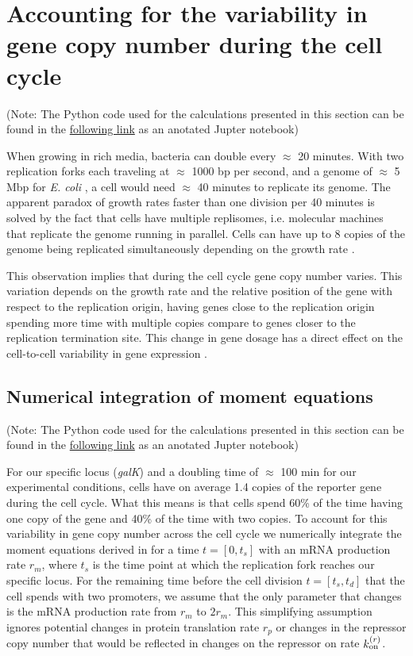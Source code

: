 \section{Accounting for the variability in gene copy number during the cell
cycle} \label{supp_multi_gene}

(Note: The Python code used for the calculations presented in this section can
be found in the
\href{https://www.rpgroup.caltech.edu/chann_cap/src/theory/html/moment_dynamics_cell_division.html}{following
link} as an anotated Jupter notebook)

When growing in rich media, bacteria can double every $\approx$ 20 minutes.
With two replication forks each traveling at $\approx$ 1000 bp per second, and
a genome of $\approx$ 5 Mbp for {\it E. coli} \cite{Moran2010}, a cell would
need $\approx$ 40 minutes to replicate its genome. The apparent paradox  of
growth rates faster than one division per 40 minutes is solved by the fact that
cells have multiple replisomes, i.e. molecular machines that replicate the
genome running in parallel. Cells can have up to 8 copies of the genome being
replicated simultaneously depending on the growth rate \cite{Bremer1996}.

This observation implies that during the cell cycle gene copy number varies.
This variation depends on the growth rate and the relative position of the gene
with respect to the replication origin, having genes close to the replication
origin spending more time with multiple copies compare to genes closer to the
replication termination site. This change in gene dosage has a direct effect on
the cell-to-cell variability in gene expression \cite{Jones2014a,
Peterson2015}.

\subsection{Numerical integration of moment equations}

(Note: The Python code used for the calculations presented in this section can
be found in the
\href{https://www.rpgroup.caltech.edu//chann_cap/software/moment_dynamics_cell_division.html}{following
link} as an anotated Jupter notebook)

For our specific locus ({\it galK}) and a doubling time of $\approx$ 100 min
for our experimental conditions, cells have on average 1.4 copies of the
reporter gene during the cell cycle. What this means is that cells spend 60\%
of the time having one copy of the gene and 40\% of the time with two copies.
To account for this variability in gene copy number across the cell cycle we
numerically integrate the moment equations derived in  for
a time $t = [0, t_s]$ with an mRNA production rate $r_m$, where $t_s$ is the
time point at which the replication fork reaches our specific locus. For the
remaining time before the cell division $t = [t_s, t_d]$ that the cell spends
with two promoters, we assume that the only parameter that changes is the mRNA
production rate from $r_m$ to $2 r_m$. This simplifying assumption ignores
potential changes in protein translation rate $r_p$ or changes in the repressor
copy number that would be reflected in changes on the repressor on rate
$k^{(r)}_{\text{on}}$.

